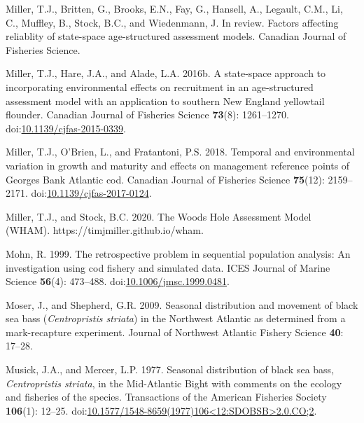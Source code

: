 \documentclass[
]{article}
\newlength{\cslhangindent}
\newlength{\cslentryspacingunit} %
\newenvironment{CSLReferences}[2] %
 {%
  \setlength{\parindent}{0pt}
  \ifodd #1
  \let\oldpar\par
  \def\par{\hangindent=\cslhangindent\oldpar}
  \fi
  \setlength{\parskip}{#2\cslentryspacingunit}
 }%
 {}
\begin{document}
\begin{CSLReferences}{1}{0}
\leavevmode{}%
Miller, T.J., Britten, G., Brooks, E.N., Fay, G., Hansell, A., Legault,
C.M., Li, C., Muffley, B., Stock, B.C., and Wiedenmann, J. In review.
Factors affecting reliablity of state-space age-structured assessment
models. Canadian Journal of Fisheries Science.

\leavevmode{}%
Miller, T.J., Hare, J.A., and Alade, L.A. 2016b. A state-space approach
to incorporating environmental effects on recruitment in an
age-structured assessment model with an application to southern {New
England} yellowtail flounder. Canadian Journal of Fisheries Science
\textbf{73}(8): 1261--1270.
doi:\href{https://doi.org/10.1139/cjfas-2015-0339}{10.1139/cjfas-2015-0339}.

\leavevmode{}%
Miller, T.J., O'Brien, L., and Fratantoni, P.S. 2018. Temporal and
environmental variation in growth and maturity and effects on management
reference points of {Georges Bank Atlantic} cod. Canadian Journal of
Fisheries Science \textbf{75}(12): 2159--2171.
doi:\href{https://doi.org/10.1139/cjfas-2017-0124}{10.1139/cjfas-2017-0124}.

\leavevmode{}%
Miller, T.J., and Stock, B.C. 2020. The {Woods Hole Assessment Model}
({WHAM}). https://timjmiller.github.io/wham.

\leavevmode{}%
Mohn, R. 1999. The retrospective problem in sequential population
analysis: An investigation using cod fishery and simulated data. ICES
Journal of Marine Science \textbf{56}(4): 473--488.
doi:\href{https://doi.org/10.1006/jmsc.1999.0481}{10.1006/jmsc.1999.0481}.

\leavevmode{}%
Moser, J., and Shepherd, G.R. 2009. Seasonal distribution and movement
of black sea bass (\emph{{C}entropristis striata}) in the {N}orthwest
{A}tlantic as determined from a mark-recapture experiment. Journal of
Northwest Atlantic Fishery Science \textbf{40}: 17--28.

\leavevmode{}%
Musick, J.A., and Mercer, L.P. 1977. Seasonal distribution of black sea
bass, \emph{{C}entropristis striata}, in the {M}id-{A}tlantic {B}ight
with comments on the ecology and fisheries of the species. Transactions
of the American Fisheries Society \textbf{106}(1): 12--25.
doi:\href{https://doi.org/10.1577/1548-8659(1977)106\%3C12:SDOBSB\%3E2.0.CO;2}{10.1577/1548-8659(1977)106\textless12:SDOBSB\textgreater2.0.CO;2}.


\end{CSLReferences}
\end{document}
